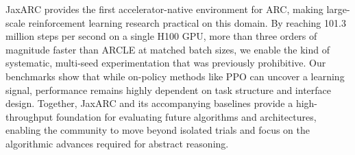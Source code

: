 JaxARC provides the first accelerator-native environment for ARC, making large-scale reinforcement learning research practical on this domain. By reaching 101.3 million steps per second on a single H100 GPU, more than three orders of magnitude faster than ARCLE at matched batch sizes, we enable the kind of systematic, multi-seed experimentation that was previously prohibitive. Our benchmarks show that while on-policy methods like PPO can uncover a learning signal, performance remains highly dependent on task structure and interface design. Together, JaxARC and its accompanying baselines provide a high-throughput foundation for evaluating future algorithms and architectures, enabling the community to move beyond isolated trials and focus on the algorithmic advances required for abstract reasoning.